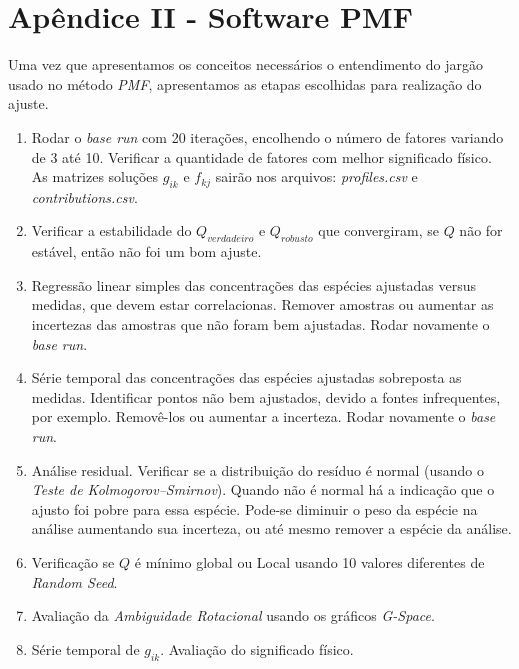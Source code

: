 \section{Apêndice II - Software PMF}

Uma vez que apresentamos os conceitos necessários o entendimento do jargão 
usado no método \textit{PMF}, apresentamos as etapas escolhidas para realização 
do ajuste.

\begin{enumerate}
  \item Rodar o \textit{base run} com 20 iterações, encolhendo o número de 
        fatores variando de 3 até 10. 
        Verificar a quantidade de fatores com melhor significado físico. 
        As matrizes soluções $g_{ik}$ e $f_{kj}$ sairão nos arquivos: 
        \textit{profiles.csv} e \textit{contributions.csv}.
  \item Verificar a estabilidade do $Q_{verdadeiro}$ e $Q_{robusto}$ que 
        convergiram, se $Q$ não for estável, então não foi um bom ajuste.
  \item Regressão linear simples das concentrações das espécies ajustadas 
        versus medidas, que devem estar correlacionas. 
        Remover amostras ou aumentar as incertezas das amostras que não foram 
        bem ajustadas. Rodar novamente o \textit{base run}.  
  \item Série temporal das concentrações das espécies ajustadas sobreposta
        as medidas. 
        Identificar pontos não bem ajustados, devido a fontes infrequentes, 
        por exemplo.
        Removê-los ou aumentar a incerteza. Rodar novamente o \textit{base run}.
  \item Análise residual. Verificar se a distribuição do resíduo é normal 
        (usando o \textit{Teste de Kolmogorov–Smirnov}). 
        Quando não é normal há a indicação que o ajusto foi pobre para essa 
        espécie. 
        Pode-se diminuir o peso da espécie na análise aumentando sua incerteza, 
        ou até mesmo remover a espécie da análise.
  \item Verificação se $Q$ é mínimo global ou Local usando 10 valores 
        diferentes de \textit{Random Seed}.
  \item Avaliação da \textit{Ambiguidade Rotacional} usando os 
        gráficos \textit{G-Space}.
  \item Série temporal de $g_{ik}$. Avaliação do significado físico.
\end{enumerate}
